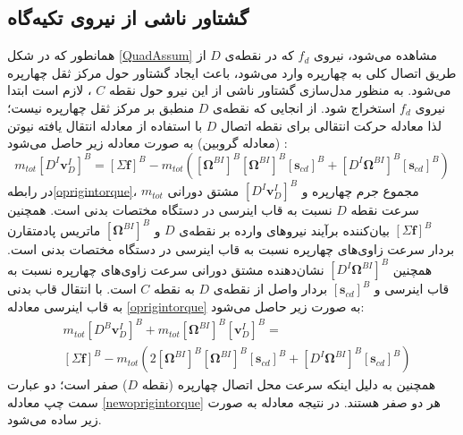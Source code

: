\subsection{گشتاور ناشی از نیروی تكیه‌گاه}
همانطور که در شكل \ref{QuadAssum} مشاهده می‌شود، نیروی
$f_d$
که در نقطه‌ی 
$D$
از طریق اتصال کلی به چهارپره وارد می‌شود، باعث ایجاد گشتاور حول مرکز ثقل چهارپره می‌شود. به منظور مدل‌سازی گشتاور ناشی از این نیرو حول نقطه
$C$
، لازم است ابتدا نیروی
$f_d$
استخراج شود. از انجایی که نقطه‌ی
$D$
منطبق بر مرکز ثقل چهارپره نیست؛ لذا معادله حرکت انتقالی برای نقطه اتصال
$D$
با استفاده از معادله انتقال یافته نیوتن (معادله گروبین) به صورت معادله زیر حاصل می‌شود
\cite{zipfel2000modeling}
:
\begin{equation}\label{oprigintorque}
	m_{tot} \left[D^I\boldsymbol v_D^I\right]^B = 
	\left[\Sigma \boldsymbol f\right]^B-m_{tot}\left(
	\left[\boldsymbol \Omega^{BI}\right]^B
	\left[\boldsymbol\Omega^{BI}\right]^B
	\left[\boldsymbol s_{cd}\right]^B+
	\left[D^I\boldsymbol\Omega^{BI}\right]^B
	\left[\boldsymbol s_{cd}\right]^B
	\right)
\end{equation}
در رابطه\ref{oprigintorque}، 
$m_{tot}$
مجموع جرم چهارپره و 
$\left[D^I\boldsymbol v_D^I\right]^B$
مشتق دورانی سرعت نقطه
$D$
نسبت به قاب اینرسی در دستگاه مختصات بدنی است. همچنین
$\left[\Sigma \boldsymbol f\right]^B$
بیان‌کننده برآیند نیروهای وارده بر نقطه‌ی
$D$
و
$\left[\boldsymbol\Omega^{BI}\right]^B$
ماتریس پادمتقارن بردار سرعت زاوی‌های چهارپره نسبت به قاب اینرسی در دستگاه مختصات بدنی است. همچنین
$\left[D^I\boldsymbol \Omega^{BI}\right]^B$
نشان‌دهنده مشتق دورانی سرعت زاوی‌های چهارپره نسبت به قاب اینرسی و 
$\left[\boldsymbol s_{cd}\right]^B$
بردار واصل از نقطه‌ی
$D$
به نقطه
$C$
است. با انتقال قاب بدنی به قاب اینرسی معادله 
\ref{oprigintorque}
به صورت زیر حاصل می‌شود:
\begin{equation}
\begin{split}\label{newoprigintorque}
	&m_{tot} \left[D^B\boldsymbol v_D^I\right]^B +
	m_{tot}\left[\boldsymbol\Omega^{BI}\right]^B
	\left[\boldsymbol v_D^{I}\right]^B = \\
	&\left[\Sigma \boldsymbol f\right]^B-m_{tot}\left(2
	\left[\boldsymbol\Omega^{BI}\right]^B
	\left[\boldsymbol\Omega^{BI}\right]^B
	\left[\boldsymbol s_{cd}\right]^B+
	\left[D^I\boldsymbol\Omega^{BI}\right]^B
	\left[\boldsymbol s_{cd}\right]^B
	\right)
\end{split}
\end{equation}
همچنین به دلیل اینكه سرعت محل اتصال چهارپره (نقطه
$D$)
صفر است؛ دو عبارت سمت چپ معادله
\ref{newoprigintorque} 
هر دو صفر هستند. در نتیجه معادله به صورت زیر ساده می‌شود.
